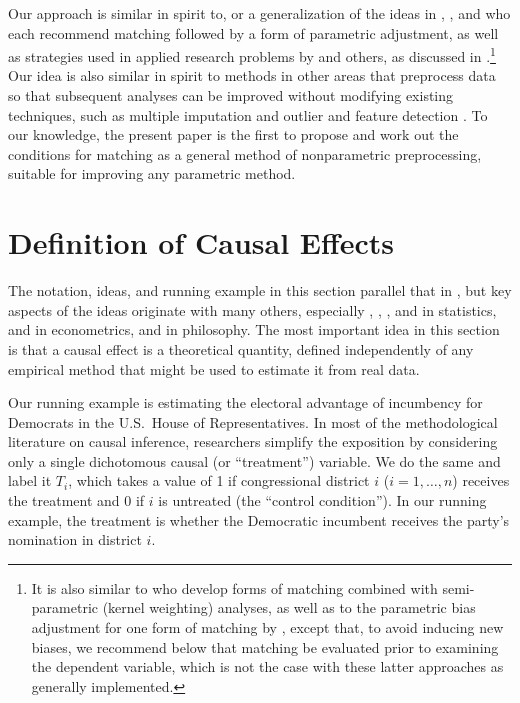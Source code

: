 \documentclass[11pt,titlepage]{article}
\begin{document}
Our approach is similar in spirit to, or a generalization of the ideas
in \citet{RosRub84a}, \citet{Rubin79}, and \citet{RubTho00} who each
recommend matching followed by a form of parametric adjustment, as
well as strategies used in applied research problems by
\citet{Rosenbaum86} and others, as discussed in
\citet{GlaLevMye03}.\footnote{It is also similar to
  \citet{HecIchTod98} who develop forms of matching combined with
  semi-parametric (kernel weighting) analyses, as well as to the
  parametric bias adjustment for one form of matching by
  \citet{AbaImb06}, except that, to avoid inducing new biases, we
  recommend below that matching be evaluated prior to examining the
  dependent variable, which is not the case with these latter
  approaches as generally implemented.}  Our idea is also similar in
spirit to methods in other areas that preprocess data so that
subsequent analyses can be improved without modifying existing
techniques, such as multiple imputation \citep{Rubin87,KinHonJos01}
and outlier and feature detection \citep[][Ch.8]{Bishop95}.  To our
knowledge, the present paper is the first to propose and work out the
conditions for matching as a general method of nonparametric
preprocessing, suitable for improving any parametric method.

\section{Definition of Causal Effects}

The notation, ideas, and running example in this section parallel that
in \citet[][Section 3.1.1]{KinKeoVer94}, but key aspects of the ideas
originate with many others, especially \citet{Neyman23b},
\citet{Fisher35}, \citet{Cox58}, \citet{Rubin74} and \citet{Holland86}
in statistics, \citet{Roy51} and \citet{Quandt72} in econometrics, and
\citet{Lewis73} in philosophy.  The most important idea in this
section is that a causal effect is a theoretical quantity, defined
independently of any empirical method that might be used to estimate
it from real data.

Our running example is estimating the electoral advantage of
incumbency for Democrats in the U.S.\ House of Representatives.  In
most of the methodological literature on causal inference, researchers
simplify the exposition by considering only a single dichotomous
causal (or ``treatment'') variable.  We do the same and label it
$T_i$, which takes a value of 1 if congressional district $i$
($i=1,\dots,n$) receives the treatment and 0 if $i$ is untreated (the
``control condition'').  In our running example, the treatment is
whether the Democratic incumbent receives the party's nomination in
district $i$.
\end{document}
